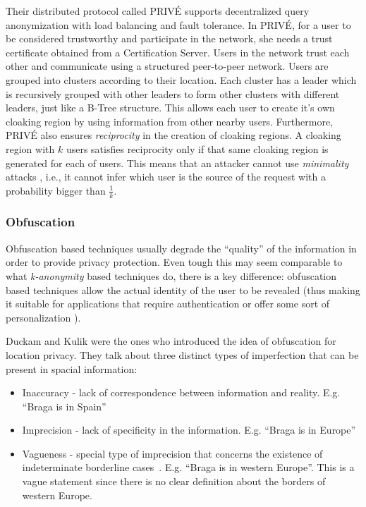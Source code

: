 Their distributed protocol called PRIVÉ supports decentralized query
anonymization with load balancing and fault tolerance. In PRIVÉ, for a
user to be considered trustworthy and participate in the network, she
needs a trust certificate obtained from a Certification Server. Users
in the network trust each other and communicate using a structured
peer-to-peer network. Users are grouped into clusters according to
their location. Each cluster has a leader which is recursively grouped
with other leaders to form other clusters with different leaders, just
like a B-Tree structure. This allows each user to create it's own
cloaking region by using information from other nearby users.
Furthermore, PRIVÉ also ensures \emph{reciprocity} in the creation of
cloaking regions. A cloaking region with $k$ users satisfies
reciprocity only if that same cloaking region is generated for each of
users. This means that an attacker cannot use \emph{minimality} attacks
\cite{wong2007minimality}, i.e., it cannot infer which user is the
source of the request with a probability bigger than $\frac{1}{k}$.

\subsubsection{Obfuscation}
\label{sec:Obfuscation}

Obfuscation based techniques usually degrade the ``quality'' of the
information in order to provide privacy protection. Even tough this may
seem comparable to what \emph{k-anonymity} based techniques do, there is a
key difference: obfuscation based techniques allow the actual identity
of the user to be revealed (thus making it suitable for applications
that require authentication or offer some sort of personalization
\cite{langheinrich2001privacy}).

Duckam and Kulik
\cite{duckham2005formal} were the ones who introduced the idea of
obfuscation for location privacy. They talk about three distinct types of
imperfection that can be present in spacial information:
\begin{itemize}
\item Inaccuracy - lack of correspondence between information and
  reality. E.g. ``Braga is in Spain''
\item Imprecision - lack of specificity in the information. E.g.
  ``Braga is in Europe''
\item Vagueness - special type of imprecision that concerns the
  existence of indeterminate borderline
  cases~\cite{duckham2001formal}. E.g. ``Braga is in western Europe''.
  This is a vague statement since there is no clear definition about
  the borders of western Europe.
\end{itemize}

